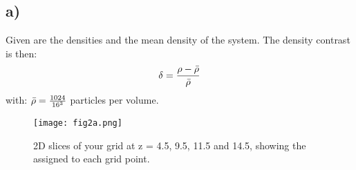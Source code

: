 \subsection{a)}
Given are the densities and the mean density of the system. The density contrast is then:
\begin{align}
    \delta = \frac{\rho - \Bar{\rho}}{\Bar{\rho}}
\end{align}
with: $\Bar{\rho} = \frac{1024}{16^3}$ particles per volume. 

\begin{figure}[h!]
    \centering
    \texttt{[image: fig2a.png]}
    \caption{2D slices of your grid at z = 4.5, 9.5, 11.5 and
    14.5, showing the assigned to each grid point.}
\end{figure}



